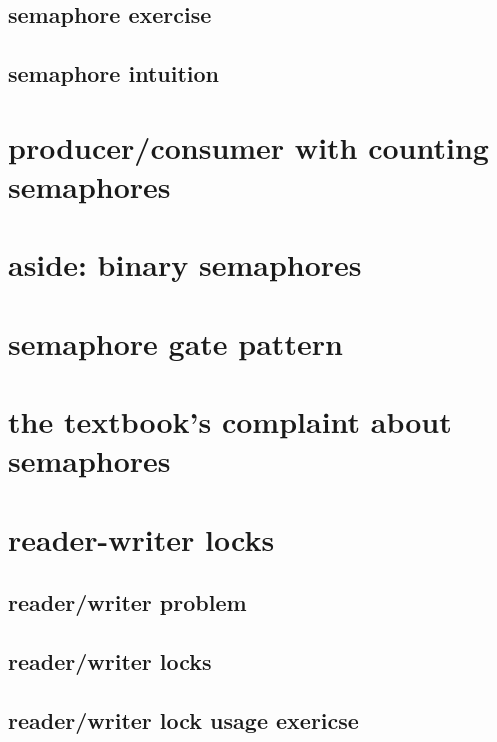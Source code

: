 

\subsection{semaphore exercise}


\subsection{semaphore intuition}


\section{producer/consumer with counting semaphores}


\section{aside: binary semaphores}


\section{semaphore gate pattern}


\section{the textbook's complaint about semaphores}


\section{reader-writer locks}

\subsection{reader/writer problem}



\subsection{reader/writer locks}



\subsection{reader/writer lock usage exericse}


